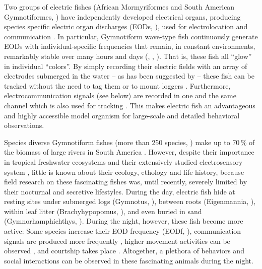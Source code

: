 Two groups of electric fishes (African Mormyriformes and South American Gymnotiformes, ) have independently developed electrical organs, producing species specific electric organ discharges (EODs, \citealp{Hopkins1978, Turner2007}), used for electrolocation \citep{Nelson1999, Fotowat2013} and communication \citep{Smith2013}. In particular, Gymnotiform wave-type fish continuously generate EODs with individual-specific frequencies that remain, in constant environments, remarkably stable over many hours and days (\citealp{Bullock1970, Moortgat1998}, , ). That is, these fish all “glow” in individual “colors”. By simply recording their electric fields with an array of electrodes submerged in the water -- as has been suggested by \citet{Hagedorn1985} -- these fish can be tracked without the need to tag them or to mount loggers \citep{Jun2013, Matias2015, Madhav2018, Henninger2018, Henninger2020}. Furthermore, electrocommunication signals (see below) are recorded in one and the same channel which is also used for tracking \citep{Henninger2018}. This makes electric fish an advantageous and highly accessible model organism for large-scale and detailed behavioral observations.

Species diverse Gymnotiform fishes (more than 250 species, \citealp{Albert2005, Ferraris2017}) make up to 70\,\% of the biomass of large rivers in South America \citep{Marrero1991, Cox2004, Crampton2011}. However, despite their importance in tropical freshwater ecosystems \citep{Cox2004, Crampton2011} and their extensively studied electrosensory system \citep{Benda2005, Bullock2006, Grewe2017, Sinz2020}, little is known about their ecology, ethology and life history, because field research on these fascinating fishes was, until recently, severely limited by their nocturnal and secretive lifestyles. During the day, electric fish hide at resting sites under submerged logs (Gymnotus, \citealp{Westby1970}), between roots (Eigenmannia, \citealp{Hopkins1974}), within leaf litter (Brachyhypopomus, \citealp{Hagedorn1988}), and even buried in sand (Gymnorhamphichthys, \citealp{Lissmann1965}). During the night, however, these fish become more active: Some species increase their EOD frequency (EODf, \citealp{Lissmann1965, Stoddard2007}), communication signals are produced more frequently \citep{Zupanc2001, Henninger2018}, higher movement activities can be observed \citep{Henninger2020}, and courtship takes place \citep{Hagedorn1985, Henninger2018}. Altogether, a plethora of behaviors and social interactions can be observed in these fascinating animals during the night.

